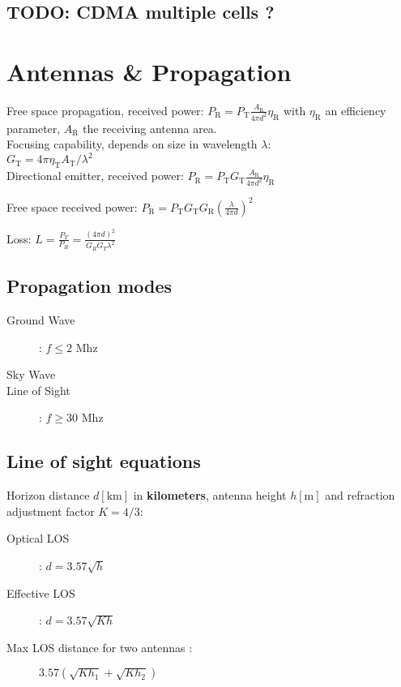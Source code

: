 \documentclass[11pt, a4paper,twocolumn]{scrartcl}
\begin{document}
\subsection{TODO: CDMA multiple cells ?}

\section{Antennas \& Propagation}
Free space propagation, received power: $P_\textrm{R} = P_\textrm{T}\frac{A_\textrm{R}}{4\pi d^2}\eta_\textrm{R}$ with $\eta_\textrm{R}$ an efficiency parameter, $A_\textrm{R}$ the receiving antenna area.
\\
Focusing capability, depends on size in wavelength $\lambda$:  
\\$G_\textrm{T} = 4\pi\eta_\textrm{T}A_\textrm{T}/\lambda^2$ \\
Directional emitter, received power: $P_\textrm{R} = P_\textrm{T}G_\textrm{T}\frac{A_\textrm{R}}{4\pi d^2}\eta_\textrm{R}$

Free space received power: $P_\textrm{R} =  P_\textrm{T}G_\textrm{T}G_\textrm{R}(\frac{\lambda}{4\pi d})^2$

Loss: $L = \frac{P_T}{P_R} = \frac{(4\pi d)^2}{G_RG_T\lambda^2} $

\subsection{Propagation modes}
\begin{multicols}{2}
	\begin{description}
		\item[Ground Wave] : $f \le 2$ Mhz
		\item[Sky Wave]
		\item[Line of Sight] : $f \ge 30$ Mhz
	\end{description}
\end{multicols}

\subsection{Line of sight equations}
Horizon distance $d[\textrm{km}]$ in \textbf{kilometers}, antenna height $h[\textrm{m}]$ and refraction adjustment factor $K = 4/3$:
\begin{description}
\item[Optical LOS]: $d = 3.57\sqrt{h}$
\item[Effective LOS]: $d = 3.57\sqrt{Kh}$
\item[Max LOS distance for two antennas :] $3.57(\sqrt{Kh_1}+ \sqrt{Kh_2})$
\end{description}
\end{document}
